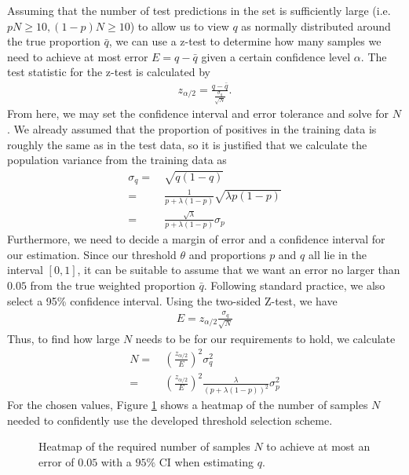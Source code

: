 \documentclass{article}
\newcommand\inputpgf[2]{{
\let\pgfimageWithoutPath\pgfimage
\renewcommand{\pgfimage}[2][]{\pgfimageWithoutPath[##1]{#1/##2}}

}}
\begin{document}
Assuming that the number of test predictions in the set is sufficiently large (i.e. $pN\geq 10, (1-p)N\geq 10$) to allow us to view $q$ as normally distributed around the true proportion $\bar{q}$, we can use a z-test to determine how many samples we need to achieve at most error $E=q-\bar{q}$ given a certain confidence level $\alpha$. The test statistic for the z-test is calculated by %
\begin{align}
z_{\alpha/2} = \frac{q-\bar{q}}{\frac{\sigma_q}{\sqrt{N}}}\text{.}
\end{align}
From here, we may set the confidence interval and error tolerance and solve for $N$.
We already assumed that the proportion of positives in the training data is roughly the same as in the test data, so it is justified that we calculate the population variance from the training data as 
\begin{align*}
    \sigma_q =& \ \sqrt{q(1-q)} \\
            =& \ \frac{1}{p+\lambda(1-p)}\sqrt{\lambda p(1-p)} \\
            =& \ \frac{\sqrt{\lambda}}{p+\lambda(1-p)}\sigma_p
\end{align*}
Furthermore, we need to decide a margin of error and a confidence interval for our estimation. Since our threshold $\theta$ and proportions $p$ and $q$ all lie in the interval $[0, 1]$, it can be suitable to assume that we want an error no larger than $0.05$ from the true weighted proportion $\bar{q}$. Following standard practice, we also select a 95\% confidence interval. Using the two-sided Z-test, we have
\begin{align}
    E = z_{\alpha/2}\frac{\sigma_q}{\sqrt{N}}
\end{align}
Thus, to find how large $N$ needs to be for our requirements to hold, we calculate
\begin{align*}
    N =& \ (\frac{z_{\alpha/2}}{E})^2\sigma_q^2 \\
      =& \ (\frac{z_{\alpha/2}}{E})^2 \frac{\lambda}{(p+\lambda(1-p))^2}\sigma_p^2
\end{align*}
For the chosen values, Figure \ref{fig:hmap} shows a heatmap of the number of samples $N$ needed to confidently use the developed threshold selection scheme.
\begin{figure}
    \centering
    \scalebox{.8}{\inputpgf{figures/}{hmap.pgf}}
    \caption{Heatmap of the required number of samples $N$ to achieve at most an error of $0.05$ with a $95\%$ CI when estimating $q$.}
    \label{fig:hmap}
\end{figure}
\end{document}
